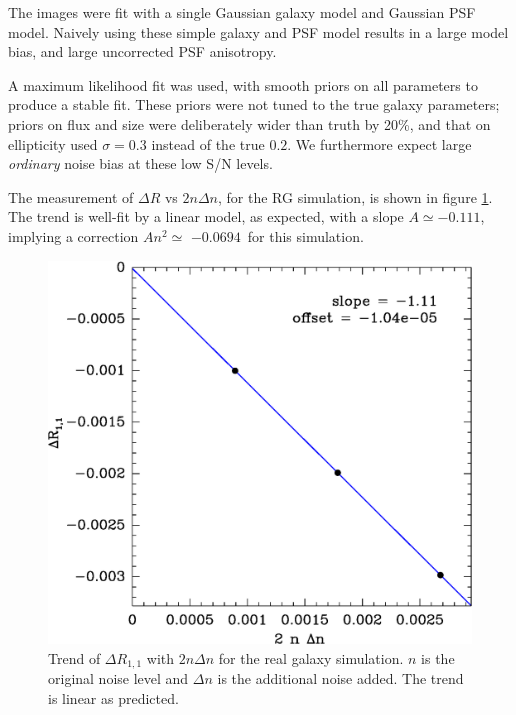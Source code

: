 \documentclass[usegraphicx,usenatbib]{mn2e}
\newcommand{\Aslope}{$-0.111$}
\newcommand{\Rcorr}{$-0.0694$}
\begin{document}
The images were fit with a single Gaussian galaxy model and Gaussian PSF model.
Naively using these simple galaxy and PSF model results in a large model bias,
and large uncorrected PSF anisotropy.

A maximum likelihood fit was used, with smooth priors on all parameters to
produce a stable fit.  These priors were not tuned to the true galaxy
parameters; priors on flux and size were deliberately wider than truth by 20\%,
and that on ellipticity used $\sigma=0.3$ instead of the true $0.2$.  We
furthermore expect large {\em ordinary} noise bias at these low S/N levels.

The measurement of $\Delta R$ vs $2 n \Delta n$, for the RG simulation, is
shown in figure \ref{fig:detrend}.  The trend is well-fit by a linear model, as
expected, with a slope $A \simeq $\Aslope, implying a correction $A n^2 \simeq$
\Rcorr\ for this simulation.

\begin{figure}
    \includegraphics[scale=0.45]{mcal-v14s01-Rnoise-detrend-R11.eps}

    \caption{Trend of $\Delta R_{1,1}$ with $2 n \Delta n$ for the
        real galaxy simulation.   $n$ is the
    original noise level and $\Delta n$ is the additional noise added.  The
    trend is linear as predicted.}

\label{fig:detrend}
\end{figure}
\end{document}
